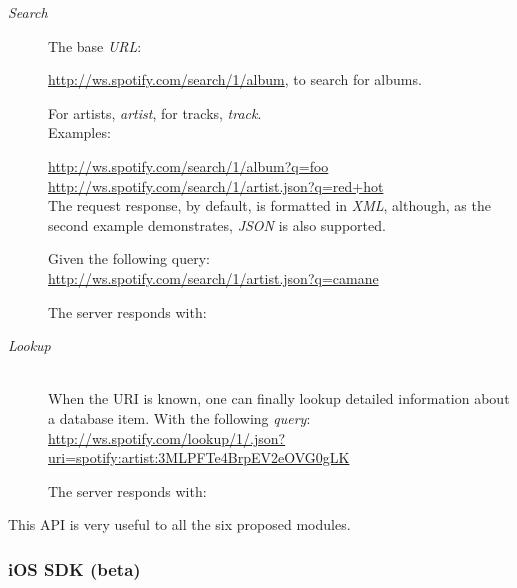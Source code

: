       \begin{description}
        \item[\emph{Search}] \hfill

          The base \emph{URL}:

          \url{http://ws.spotify.com/search/1/album}, to search for albums.

          For artists, \emph{artist}, for tracks, \emph{track}. \\

          Examples:

          \url{http://ws.spotify.com/search/1/album?q=foo} \\
          \url{http://ws.spotify.com/search/1/artist.json?q=red+hot} \\

          The request response, by default, is formatted in \emph{XML}, although, as the second example demonstrates, \emph{JSON} is also supported.

          Given the following query: \\
          \url{http://ws.spotify.com/search/1/artist.json?q=camane}

          The server responds with:

          

        \item[\emph{Lookup}] \hfill \\

          When the URI is known, one can finally lookup detailed information about a database item. With the following \emph{query}: \\
          \url{http://ws.spotify.com/lookup/1/.json?uri=spotify:artist:3MLPFTe4BrpEV2eOVG0gLK}

          The server responds with:

          

      \end{description}

      This API is very useful to all the six proposed modules.


    \subsubsection{iOS SDK (beta)} %
    \label{ssub:ios_sdk}
    
